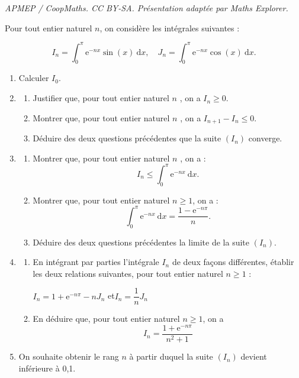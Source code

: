 \documentclass[10pt]{article}
\providecommand{\e}{{\mathrm{e}}}
\begin{document}
\noindent\textit{APMEP / CoopMaths. CC BY-SA. Présentation adaptée par Maths Explorer.}\par\medskip
\medskip

Pour tout entier naturel $n$, on considère les intégrales suivantes :

\[I_n = \displaystyle\int_0^{\pi} \text{e}^{- nx}\sin (x)\:\text{d}x, \quad  J_n = \displaystyle\int_0^{\pi} \text{e}^{-nx}\cos (x)\:\text{d}x.\]

\medskip

\begin{enumerate}
\item Calculer $I_0$.
\item 
	\begin{enumerate}
		\item Justifier que, pour tout entier naturel $n$ , on a $I_n \geqslant 0$.
		\item Montrer que, pour tout entier naturel $n$ , on a $I_{n+1} - I_n \leqslant 0$.
		\item Déduire des deux questions précédentes que la suite $\left(I_n\right)$ converge.
	\end{enumerate}
\item
	\begin{enumerate}
		\item Montrer que, pour tout entier naturel $n$ , on a : 
		\[I_n \leqslant \displaystyle\int_0^{\pi} \text{e}^{- nx}\:\text{d}x.\]
		

		\item Montrer que, pour tout entier naturel $n \geqslant 1$, on a : 
		\[\displaystyle\int_0^{\pi} \text{e}^{- nx}\:\text{d}x = \dfrac{1 - \e^{-n \pi}}{n}.\]
		
		\item Déduire des deux questions précédentes la limite de la suite $\left(I_n\right)$.
	\end{enumerate}
\item
	\begin{enumerate}
		\item En intégrant par parties l'intégrale $I_n$ de deux façons différentes, établir les deux relations suivantes, pour tout entier naturel $n \geqslant 1$ :

\begin{center}$I_n = 1 + \e^{-n\pi} - nJ_n$ \quad et\quad  $I_n = \dfrac 1n J_n$\end{center}

		\item En déduire que, pour tout entier naturel $n \geqslant 1$, on a 
		\[I_n = \dfrac{1 + \e^{-n \pi}}{n^2 + 1}\]
	\end{enumerate}
\item On souhaite obtenir le rang $n$ à partir duquel la suite $\left(I_n\right)$ devient inférieure à 0,1.


\end{enumerate}
\end{document}
